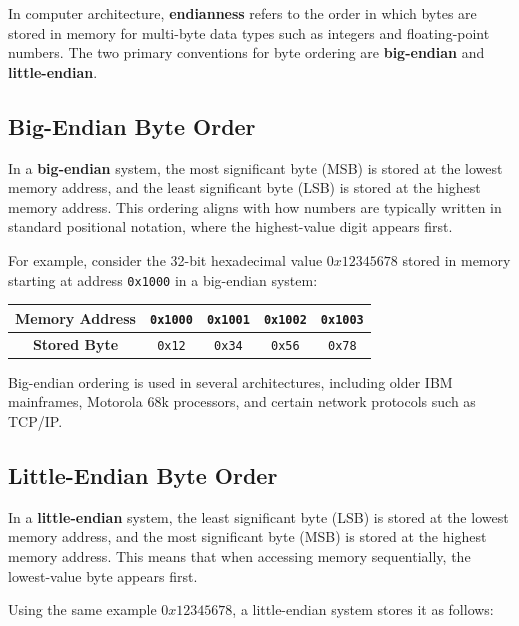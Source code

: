 In computer architecture, \textbf{endianness} refers to the order in which bytes are stored in memory for multi-byte data types such as integers and floating-point numbers. The two primary conventions for byte ordering are \textbf{big-endian} and \textbf{little-endian}.

\subsection{Big-Endian Byte Order}
In a \textbf{big-endian} system, the most significant byte (MSB) is stored at the lowest memory address, and the least significant byte (LSB) is stored at the highest memory address. This ordering aligns with how numbers are typically written in standard positional notation, where the highest-value digit appears first.

For example, consider the 32-bit hexadecimal value \( 0x12345678 \) stored in memory starting at address \texttt{0x1000} in a big-endian system:

\begin{center}
\begin{tabular}{|c|c|c|c|c|}
\hline
\textbf{Memory Address} & \texttt{0x1000} & \texttt{0x1001} & \texttt{0x1002} & \texttt{0x1003} \\
\hline
\textbf{Stored Byte}    & \texttt{0x12}   & \texttt{0x34}   & \texttt{0x56}   & \texttt{0x78}   \\
\hline
\end{tabular}
\end{center}

Big-endian ordering is used in several architectures, including older IBM mainframes, Motorola 68k processors, and certain network protocols such as TCP/IP.

\subsection{Little-Endian Byte Order}
In a \textbf{little-endian} system, the least significant byte (LSB) is stored at the lowest memory address, and the most significant byte (MSB) is stored at the highest memory address. This means that when accessing memory sequentially, the lowest-value byte appears first.

Using the same example \( 0x12345678 \), a little-endian system stores it as follows:

